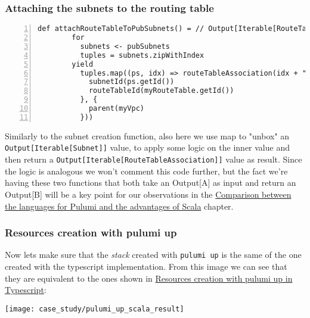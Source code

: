 \subsubsection{Attaching the subnets to the routing table}
\begin{minipage}{\linewidth}
\begin{lstlisting}[numbers=left, numberstyle=\tiny, numbersep=-5pt, stepnumber=1]
  def attachRouteTableToPubSubnets() = // Output[Iterable[RouteTableAssociation]] 
        for
          subnets <- pubSubnets
          tuples = subnets.zipWithIndex
        yield
          tuples.map((ps, idx) => routeTableAssociation(idx + "-assoc-scala") ({
            subnetId(ps.getId())
            routeTableId(myRouteTable.getId())
          }, {
            parent(myVpc)
          }))
\end{lstlisting}
\end{minipage}
Similarly to the subnet creation function, also here we use map to "unbox" an \texttt{Output[Iterable[Subnet]]} value, to apply some logic on the inner value and then return a \texttt{Output[Iterable[RouteTableAssociation]]} value as result.
Since the logic is analogous we won't comment this code further, but the fact we're having these two functions that both take an Output[A] as input and return an Output[B] will be a key point for our observations in the \hyperref[cap:comparisons]{Comparison between the languages for Pulumi and the advantages of Scala} chapter.

\subsubsection{Resources creation with pulumi up}
\label{sssec:res-cre-ts}
Now lets make sure that the \textit{stack} created with \texttt{pulumi up} is the same of the one created with the typescript implementation.
From this image we can see that they are equivalent to the ones shown in \hyperref[sssec:res-cre-ts]{Resources creation with pulumi up in Typescript}:
\begin{center}
  \texttt{[image: case\_study/pulumi\_up\_scala\_result]} 
\end{center}\mbox{}\\

